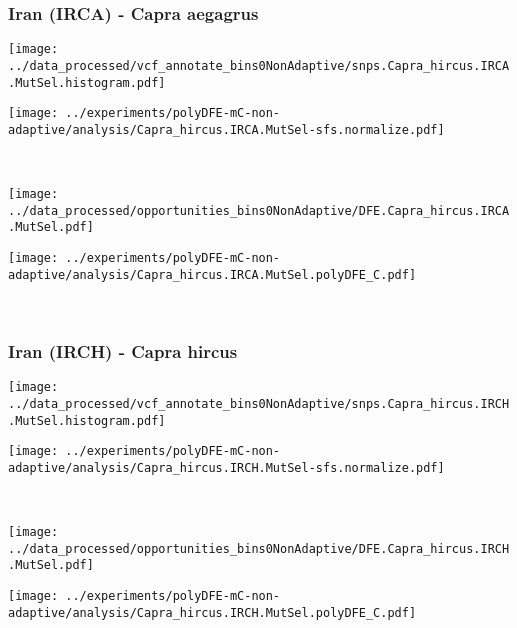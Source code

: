 \subsubsection{Iran (IRCA) - Capra aegagrus}

\begin{minipage}{0.49\linewidth}
    \texttt{[image: ../data\_processed/vcf\_annotate\_bins0NonAdaptive/snps.Capra\_hircus.IRCA.MutSel.histogram.pdf]}
\end{minipage}
\begin{minipage}{0.49\linewidth}
    \texttt{[image: ../experiments/polyDFE-mC-non-adaptive/analysis/Capra\_hircus.IRCA.MutSel-sfs.normalize.pdf]}
\end{minipage}
\\
\begin{minipage}{0.49\linewidth}
    \texttt{[image: ../data\_processed/opportunities\_bins0NonAdaptive/DFE.Capra\_hircus.IRCA.MutSel.pdf]}
\end{minipage}
\begin{minipage}{0.49\linewidth}
    \texttt{[image: ../experiments/polyDFE-mC-non-adaptive/analysis/Capra\_hircus.IRCA.MutSel.polyDFE\_C.pdf]}
\end{minipage}
\\

\subsubsection{Iran (IRCH) - Capra hircus}

\begin{minipage}{0.49\linewidth}
    \texttt{[image: ../data\_processed/vcf\_annotate\_bins0NonAdaptive/snps.Capra\_hircus.IRCH.MutSel.histogram.pdf]}
\end{minipage}
\begin{minipage}{0.49\linewidth}
    \texttt{[image: ../experiments/polyDFE-mC-non-adaptive/analysis/Capra\_hircus.IRCH.MutSel-sfs.normalize.pdf]}
\end{minipage}
\\
\begin{minipage}{0.49\linewidth}
    \texttt{[image: ../data\_processed/opportunities\_bins0NonAdaptive/DFE.Capra\_hircus.IRCH.MutSel.pdf]}
\end{minipage}
\begin{minipage}{0.49\linewidth}
    \texttt{[image: ../experiments/polyDFE-mC-non-adaptive/analysis/Capra\_hircus.IRCH.MutSel.polyDFE\_C.pdf]}
\end{minipage}
\\

